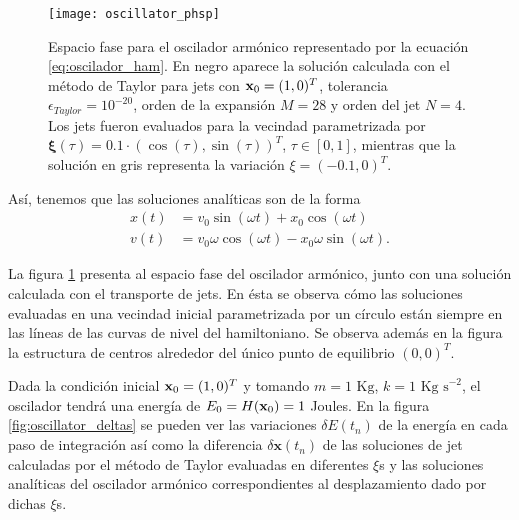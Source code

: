 \begin{figure}[h!]
 \centering
 \texttt{[image: oscillator\_phsp]}
 \caption{Espacio fase para el oscilador armónico representado por la ecuación \ref{eq:oscilador_ham}. En negro aparece la solución calculada con el método de Taylor para jets con $\mathbf{x}_0 = (1,0)^T$, tolerancia $\epsilon_{Taylor} = 10^{-20}$, orden de la expansión $M = 28$ y orden del jet $N=4$. Los jets fueron evaluados para la vecindad parametrizada por $\mathbf{\xi}(\tau) = 0.1\cdot \left( \cos(\tau), \sin(\tau) \right)^T$, $\tau \in [0,1]$, mientras que la solución en gris representa la variación $\xi = (-0.1,0)^T$.}
 \label{fig:oscilador_phsp}
\end{figure}

Así, tenemos que las soluciones analíticas son de la forma 
\begin{align}
 x(t) &= v_{0}\sin{(\omega t)} + x_{0}\cos{(\omega t)} \nonumber \\ 
 v(t) &= v_{0}\omega\cos{(\omega t)} - x_{0}\omega\sin{(\omega t)}. 
 \label{eq:oscilador_analytical}
\end{align}

La figura \ref{fig:oscilador_phsp} presenta al espacio fase del oscilador armónico, junto con una solución calculada con el transporte de jets. En ésta se observa cómo las soluciones evaluadas en una vecindad inicial parametrizada por un círculo están siempre en las líneas de las curvas de nivel del hamiltoniano. Se observa además en la figura la estructura de centros alrededor del único punto de equilibrio $(0,0)^T$.

Dada la condición inicial $\mathbf{x}_0 = (1,0)^T$ y tomando $m = 1 \textrm{ Kg}$, $k = 1 \textrm{ Kg s}^{-2}$, el oscilador tendrá una energía de $E_0 = H(\mathbf{x}_0) = 1$ Joules. En la figura \ref{fig:oscillator_deltas} se pueden ver las variaciones $\delta E(t_n)$ de la energía en cada paso de integración así como la diferencia $\delta \mathbf{x}(t_n)$ de las soluciones de jet calculadas por el método de Taylor evaluadas en diferentes $\xi$s y las soluciones analíticas del oscilador armónico correspondientes al desplazamiento dado por dichas $\xi$s.

